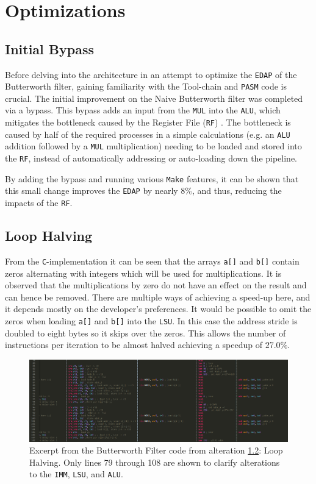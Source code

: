 \documentclass[letterpaper, 10 pt, conference]{ieeeconf}  %
\begin{document}
\section{Optimizations}

\subsection{Initial Bypass}
\label{imp:A}

Before delving into the architecture in an attempt to optimize the \texttt{EDAP} of the Butterworth filter, gaining familiarity with the Tool-chain and \texttt{PASM} code is crucial. The initial improvement on the Naive Butterworth filter was completed via a bypass. This bypass adds an input from the \texttt{MUL} into the \texttt{ALU}, which mitigates the bottleneck caused by the Register File (\texttt{RF}) . The bottleneck is caused by half of the required processes in a simple calculations (e.g. an \texttt{ALU} addition followed by a \texttt{MUL} multiplication) needing to be loaded and stored into the \texttt{RF}, instead of automatically addressing or auto-loading down the pipeline. 

By adding the bypass and running various \texttt{Make} features, it can be shown that this small change improves the \texttt{EDAP} by nearly $8\%$, and thus, reducing the impacts of the \texttt{RF}. 

\subsection{Loop Halving}
\label{imp:B}

From the \texttt{C}-implementation it can be seen that the arrays \texttt{a[]} and \texttt{b[]} contain zeros alternating with integers which will be used for multiplications. It is observed that the multiplications by zero do not have an effect on the result and can hence be removed. There are multiple ways of achieving a speed-up here, and it depends mostly on the developer's preferences. It would be possible to omit the zeros when loading \texttt{a[]} and \texttt{b[]} into the \texttt{LSU}. In this case the address stride is doubled to eight bytes so it skips over the zeros. This allows the number of instructions per iteration to be almost halved achieving a speedup of $27.0\%$.

\begin{figure}[ht]
\begin{center}
\includegraphics[scale=0.265]{images/assem02.png}
\caption{Excerpt from the Butterworth Filter code from alteration \ref{imp:B}: Loop Halving. Only lines 79 through 108 are shown to clarify alterations to the \texttt{IMM}, \texttt{LSU}, and \texttt{ALU}.}
\label{fig:assem02}
\end{center}
\end{figure}
\end{document}
